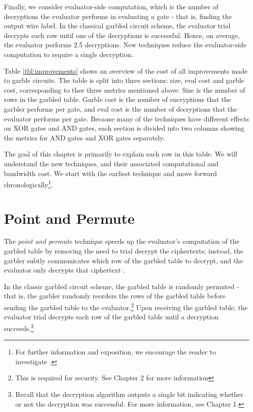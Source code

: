 Finally, we consider evaluator-side computation, which is the number of decryptions the evaluator performs in evaluating a gate - that is, finding the output wire label.
In the classical garbled circuit scheme, the evaluator trial decrypts each row until one of the decryptions is successful.
Hence, on average, the evaluator performs 2.5 decryptions.
New techniques reduce the evaluator-side computation to require a single decryption.



Table \ref{tbl:improvements} shows an overview of the cost of all improvements made to garble circuits.
The table is split into three sections: size, eval cost and garble cost, corresponding to thee three metrics mentioned above.
Size is the number of rows in the garbled table.
Garble cost is the number of encryptions that the garbler performs per gate, and eval cost is the number of decryptions that the evaluator performs per gate. 
Because many of the techniques have different effects on XOR gates and AND gates, each section is divided into two columns showing the metrics for AND gates and XOR gates separately.

The goal of this chapter is primarily to explain each row in this table.
We will understand the new techniques, and their associated computational and bandwidth cost.
We start with the earliest technique and move forward chronologically\footnote{For further information and exposition, we encourage the reader to investigate \cite{mikes-video}.}.

\section{Point and Permute}
The \textit{point and permute} technique speeds up the evaluator's computation of the garbled table by removing the need to trial decrypt the ciphertexts; instead, the garbler subtly communicates which row of the garbled table to decrypt, and the evaluator only decrypts that ciphertext \cite{fairplay}.

In the classic garbled circuit scheme, the garbled table is randomly permuted - that is, the garbler randomly reorders the rows of the garbled table before sending the garbled table to the evaluator.\footnote{This is required for security. See Chapter 2 for more information}
Upon receiving the garbled table, the evaluator trial decrypts each row of the garbled table until a decryption succeeds.\footnote{Recall that the decryption algorithm outputs a single bit indicating whether or not the decryption was successful. For more information, see Chapter 1.}

